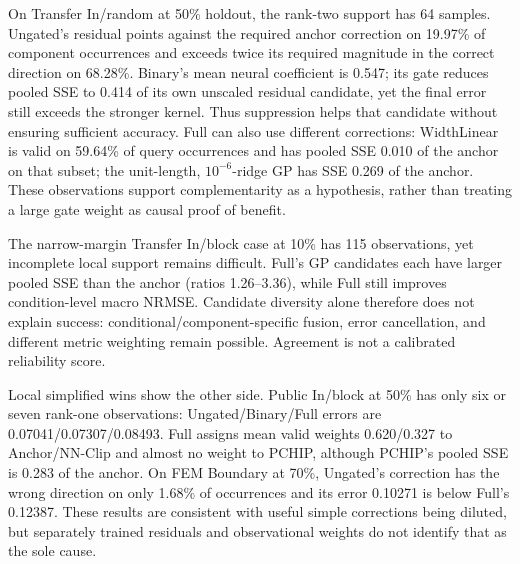 \documentclass[conference,9pt,letterpaper]{IEEEtran}
\begin{document}
On Transfer In/random at 50\% holdout, the rank-two support has 64 samples.
Ungated's residual points against the required anchor correction on
19.97\% of component occurrences and exceeds twice its required magnitude
in the correct direction on 68.28\%. Binary's mean neural coefficient is
0.547; its gate reduces pooled SSE to 0.414 of its own unscaled residual
candidate, yet the final error still exceeds the stronger kernel.
Thus suppression helps that candidate without ensuring sufficient accuracy.
Full can also use different corrections: WidthLinear is valid on 59.64\%
of query occurrences and has pooled SSE 0.010 of the anchor on that subset;
the unit-length, $10^{-6}$-ridge GP has SSE 0.269 of the anchor. These
observations support complementarity as a hypothesis, rather than treating
a large gate weight as causal proof of benefit.

The narrow-margin Transfer In/block case at 10\% has 115 observations,
yet incomplete local support remains difficult. Full's GP candidates each
have larger pooled SSE than the anchor (ratios 1.26--3.36), while Full
still improves condition-level macro NRMSE. Candidate diversity alone
therefore does not explain success: conditional/component-specific fusion,
error cancellation, and different metric weighting remain possible.
Agreement is not a calibrated reliability score.

Local simplified wins show the other side. Public In/block at 50\% has
only six or seven rank-one observations: Ungated/Binary/Full errors are
0.07041/0.07307/0.08493. Full assigns mean valid weights 0.620/0.327 to
Anchor/NN-Clip and almost no weight to PCHIP, although PCHIP's pooled SSE
is 0.283 of the anchor. On FEM Boundary at 70\%, Ungated's correction
has the wrong direction on only 1.68\% of occurrences and its error
0.10271 is below Full's 0.12387. These results are consistent with useful
simple corrections being diluted, but separately trained residuals and
observational weights do not identify that as the sole cause.

\begin{table}[t]
\centering\footnotesize\setlength{\tabcolsep}{3pt}
\caption{Completed bounded controls, same 60 conditions and original
mean-mask macro errors. $^*$Both shows strict/tolerance win counts, each
out of 60. Worst $R$ uses the stronger kernel; mean $E$ is the unweighted
mean of the 60 cell errors. C2 uses frozen candidates; C1/C3 are retrained.}
\label{tab:mechanism_controls}
\end{table}

\end{document}

